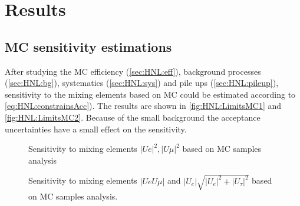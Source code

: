 \documentclass[../main.tex]{subfiles}
\begin{document}
\chapter{Results}
\section{MC sensitivity estimations}
\label{sec:HNL:MCres}

After studying the MC efficiency (\autoref{sec:HNL:eff}), background processes (\autoref{sec:HNL:bg}), systematics (\autoref{sec:HNL:sys}) and pile ups (\autoref{sec:HNL:pileup}),  sensitivity to the mixing elements based on MC could be estimated according to \autoref{eq:HNL:constrainsAcc}). The results are shown in \autoref{fig:HNL:LimitsMC1} and \autoref{fig:HNL:LimitsMC2}. Because of the small background the acceptance uncertainties have a small effect on the sensitivity.

\begin{figure}[!ht]
    \begin{center}
  \begin{minipage}{0.49\linewidth}
  \end{minipage}
  \hfill
  \begin{minipage}{0.49\linewidth}
  \end{minipage}
  \caption{Sensitivity to mixing elements $\left|Ue\right|^2, \left|U\mu\right|^2$ based on MC samples analysis}
  \label{fig:HNL:LimitsMC1}
    \end{center}
\end{figure}

\begin{figure}[!ht]
    \begin{center}
  \begin{minipage}{0.49\linewidth}
  \end{minipage}
  \begin{minipage}{0.49\linewidth}
  \end{minipage}
  \caption{Sensitivity to mixing elements $\left|UeU\mu\right|$ and $\left|U_{e}\right|\sqrt{\left|U_{e}\right|^2+\left|U_{\tau}\right|^2}$ based on MC samples analysis.}
  \label{fig:HNL:LimitsMC2}
  \end{center}
\end{figure}
\end{document}
